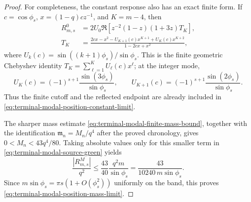 \begin{proof}
For completeness, the constant response also has an exact finite form.  If
$c=\cos\phi_s$, $x=(1-q)cz^{-1}$, and $K=m-4$, then
\begin{align}
 R^0_{m,s}
 &=2U_0\Re\!\left[z^{-2}(1-z)(1+3z)T_K\right],
 \label{eq:terminal-modal-position-constant-exact}\\
 T_K
 &=\frac{2cx-x^2-U_{K+1}(c)x^{K+1}+U_K(c)x^{K+2}}
 {1-2cx+x^2},
 \label{eq:terminal-modal-position-Chebyshev-sum}
\end{align}
where $U_k(c)=\sin((k+1)\phi_s)/\sin\phi_s$.  This is the finite geometric
Chebyshev identity $T_K=\sum_{\ell=1}^KU_\ell(c)x^\ell$; at the integer mode,
\begin{equation}
 U_K(c)=(-1)^{s+1}\frac{\sin(3\phi_s)}{\sin\phi_s},
 \qquad
 U_{K+1}(c)=(-1)^{s+1}\frac{\sin(2\phi_s)}{\sin\phi_s}.
 \label{eq:terminal-modal-position-Chebyshev-end}
\end{equation}
Thus the finite cutoff and the reflected endpoint are already included in
\eqref{eq:terminal-modal-position-constant-limit}.

The sharper mass estimate
\eqref{eq:terminal-modal-finite-mass-bound}, together with the identification
$\mathfrak m_n=M_n/q^4$ after the proved chronology, gives
$0<M_n<43q^4/80$.  Taking absolute values only for this smaller term in
\eqref{eq:terminal-modal-source-green} yields
\begin{equation}
 \frac{|R^M_{m,s}|}{q^2}
 \le\frac{43}{40}\frac{q^2m}{\sin\phi_s}
 =\frac{43}{10240\,m\sin\phi_s}.
 \label{eq:terminal-modal-position-mass-finite}
\end{equation}
Since $m\sin\phi_s=\pi s(1+O(\phi_s^2))$ uniformly on the band, this proves
\eqref{eq:terminal-modal-position-mass-limit}.


\end{proof}
